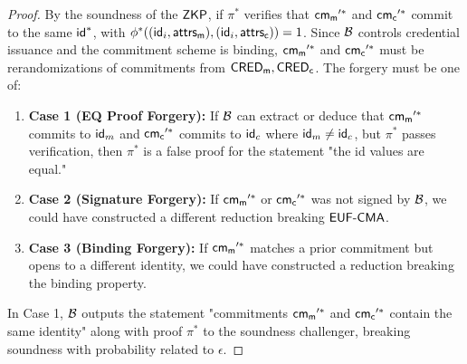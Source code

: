 \begin{proof}
By the soundness of the $\mathsf{ZKP}$, if $\pi^*$ verifies that $\mathsf{cm_m}'^*$ and $ \mathsf{cm_c}'^*$ commit to the same $\mathsf{id}^*$, with $\phi^*((\mathsf{id}_i, \mathsf{attrs_m}), (\mathsf{id}_i, \mathsf{attrs_c})) = 1$. Since $\mathcal{B}$ controls credential issuance and the commitment scheme is binding, $\mathsf{cm_m}'^*$ and $\mathsf{cm_c}'^*$ must be rerandomizations of commitments from $\mathsf{CRED_m}, \mathsf{CRED_c}$. The forgery must be one of:
\begin{enumerate}
    
    \item \textbf{Case 1 (EQ Proof Forgery):} If $\mathcal{B}$ can extract or deduce that $\mathsf{cm_m}'^*$ commits to $\mathsf{id}_m$ and $\mathsf{cm_c}'^*$ commits to $\mathsf{id}_c$ where $\mathsf{id}_m \neq \mathsf{id}_c$, but $\pi^*$ passes verification, then $\pi^*$ is a false proof for the statement "the id values are equal."
    
    \item \textbf{Case 2 (Signature Forgery):} If $\mathsf{cm_m}'^*$ or $\mathsf{cm_c}'^*$ was not signed by $\mathcal{B}$, we could have constructed a different reduction breaking $\mathsf{EUF\text{-}CMA}$.
    
    \item \textbf{Case 3 (Binding Forgery):} If $\mathsf{cm_m}'^*$ matches a prior commitment but opens to a different identity, we could have constructed a reduction breaking the binding property.
\end{enumerate}

In Case 1, $\mathcal{B}$ outputs the statement "commitments $\mathsf{cm_m}'^*$ and $\mathsf{cm_c}'^*$ contain the same identity" along with proof $\pi^*$ to the soundness challenger, breaking soundness with probability related to $\epsilon$.
\end{proof}











